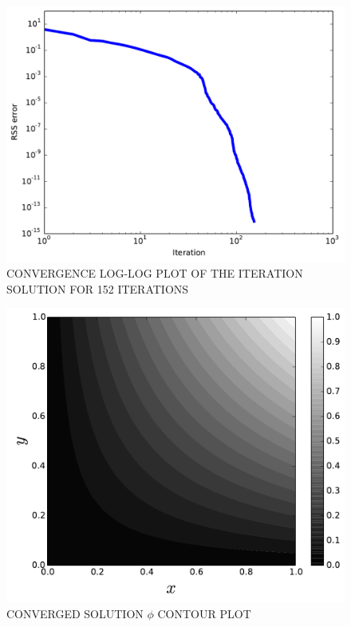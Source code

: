 \documentclass[cleanfoot,cleanhead,twocolumn,10pt,notitlepage]{asme2e}
\begin{document}
\begin{figure}[t]
\begin{center}
\includegraphics[width=\linewidth]{../Project1_code/convergence.pdf}
\caption{CONVERGENCE LOG-LOG PLOT OF THE ITERATION SOLUTION FOR 152 ITERATIONS}
\label{convergence2}
\end{center}
\end{figure}


\begin{figure}[t]
\begin{center}
    \includegraphics[width=\linewidth]{../Project1_code/phi.pdf}
    \caption{CONVERGED SOLUTION $\phi$ CONTOUR PLOT}
    \label{phi}
    \end{center}
\end{figure}
\end{document}
